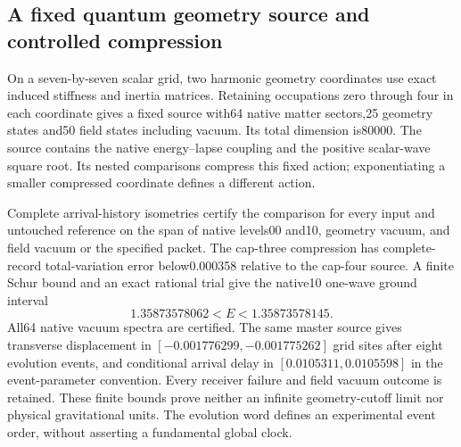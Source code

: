 \subsection{A fixed quantum geometry source and controlled compression}

On a seven-by-seven scalar grid, two harmonic geometry coordinates use
exact induced stiffness and inertia matrices. Retaining occupations zero
through four in each coordinate gives a fixed source with64 native matter
sectors,25 geometry states and50 field states including vacuum. Its total
dimension is80000. The source contains the native energy--lapse coupling
and the positive scalar-wave square root. Its nested comparisons compress
this fixed action; exponentiating a smaller compressed coordinate defines
a different action.

Complete arrival-history isometries certify the comparison for every input
and untouched reference on the span of native levels00 and10, geometry
vacuum, and field vacuum or the specified packet. The cap-three compression
has complete-record total-variation error below0.000358 relative to the
cap-four source. A finite Schur bound and an exact rational trial give the
native10 one-wave ground interval
\[
  1.35873578062 < E < 1.35873578145.
\]
All64 native vacuum spectra are certified. The same master source gives
transverse displacement in
$[-0.001776299,-0.001775262]$ grid sites after eight evolution events,
and conditional arrival delay in
$[0.0105311,0.0105598]$ in the event-parameter convention.
Every receiver failure and field vacuum outcome is retained.
These finite bounds prove neither an infinite geometry-cutoff limit nor
physical gravitational units. The evolution word defines an experimental
event order, without asserting a fundamental global clock.
